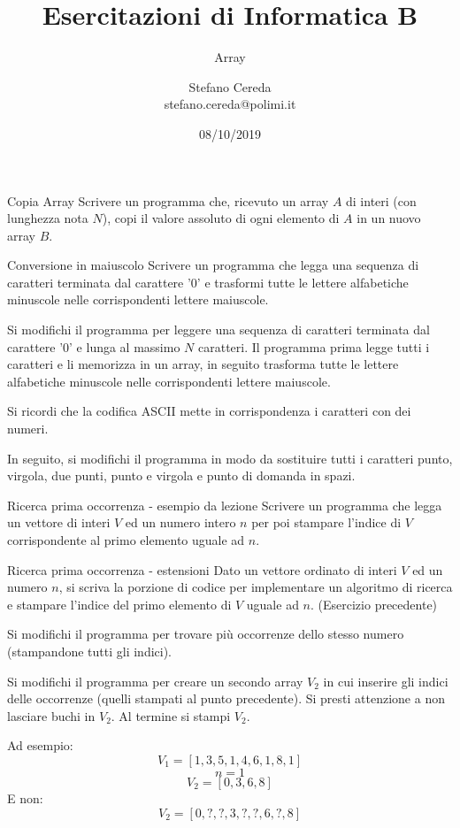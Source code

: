 \documentclass[aspectratio=169, handout]{beamer}
\title{Esercitazioni di Informatica B}
\subtitle{Array}
\author{Stefano Cereda\\
	stefano.cereda@polimi.it
}
\date{08/10/2019}
\begin{document}
\begin{frame}
    \maketitle
\end{frame}


\begin{frame}{Copia Array}
Scrivere un programma che, ricevuto un array $A$ di interi (con lunghezza nota $N$), copi il valore assoluto di ogni elemento di $A$ in un nuovo array $B$.
\end{frame}

\begin{frame}{Conversione in maiuscolo}
Scrivere un programma che legga una sequenza di caratteri terminata dal carattere '0' e trasformi tutte le lettere
    alfabetiche minuscole nelle corrispondenti lettere maiuscole.

Si modifichi il programma per leggere una sequenza di caratteri terminata dal carattere '0' e lunga al massimo $N$
    caratteri.
Il programma prima legge tutti i caratteri e li memorizza in un array, in seguito trasforma tutte le lettere alfabetiche
    minuscole nelle corrispondenti lettere maiuscole.

Si ricordi che la codifica ASCII mette in corrispondenza i caratteri con dei numeri.

In seguito, si modifichi il programma in modo da sostituire tutti i caratteri punto, virgola, due punti, punto e virgola e punto di domanda in spazi.
\end{frame}

\begin{frame}{Ricerca prima occorrenza - esempio da lezione}
Scrivere un programma che legga un vettore di interi $V$ ed un numero intero $n$ per poi stampare l'indice di $V$ corrispondente al primo elemento uguale ad $n$.
\end{frame}

\begin{frame}{Ricerca prima occorrenza - estensioni}
\footnotesize
Dato un vettore ordinato di interi $V$ ed un numero $n$, si scriva la porzione di codice per implementare un algoritmo di ricerca e stampare l'indice del primo elemento di $V$ uguale ad $n$. (Esercizio precedente)

Si modifichi il programma per trovare più occorrenze dello stesso numero (stampandone tutti gli indici).

\pause
Si modifichi il programma per creare un secondo array $V_2$ in cui inserire gli indici delle occorrenze (quelli stampati al punto precedente). Si presti attenzione a non lasciare buchi in $V_2$. Al termine si stampi $V_2$.

\pause
Ad esempio:
\[ V_1 = [1, 3, 5, 1, 4, 6, 1, 8, 1] \]
\[ n=1 \]
\[ V_2 = [0, 3, 6, 8]\]
E non:
\[ V_2 = [0, ?, ?, 3, ?, ?, 6, ?, 8]\]
\end{frame}
\end{document}
